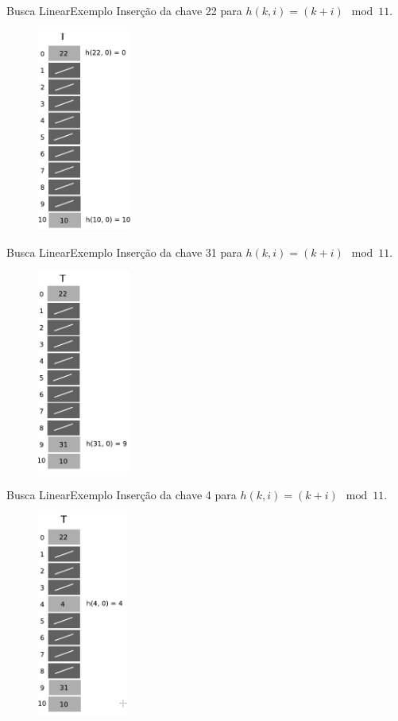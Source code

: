 \documentclass[aspectratio=169]{beamer}
\begin{document}
\begin{frame}{Busca Linear}{Exemplo}
Inserção da chave 22 para $h(k, i) = (k + i) \mod 11$.
\begin{figure}[!h]
  \centering
  \includegraphics[width=88pt]{imagens/ex_enderecamento_aberto3.png}
  \label{fig_ex_enderecamento_aberto3}
\end{figure}
\end{frame}

\begin{frame}{Busca Linear}{Exemplo}
Inserção da chave 31 para $h(k, i) = (k + i) \mod 11$.
\begin{figure}[!h]
  \centering
  \includegraphics[width=86pt]{imagens/ex_enderecamento_aberto4.png}
  \label{fig_ex_enderecamento_aberto4}
\end{figure}
\end{frame}


\begin{frame}{Busca Linear}{Exemplo}
Inserção da chave 4 para $h(k, i) = (k + i) \mod 11$.
\begin{figure}[!h]
  \centering
  \includegraphics[width=84pt]{imagens/ex_enderecamento_aberto5.png}
  \label{fig_ex_enderecamento_aberto5}
\end{figure}
\end{frame}
\end{document}
